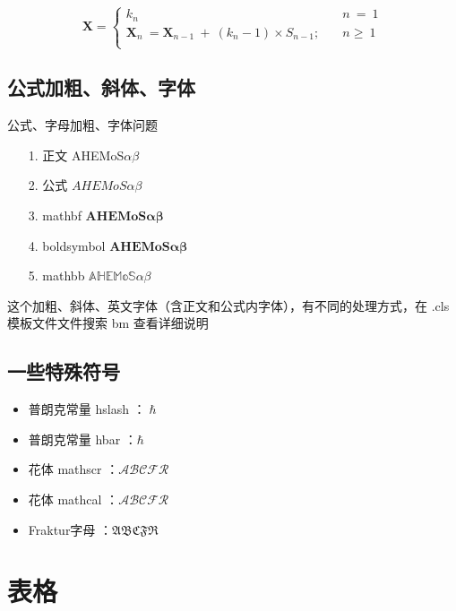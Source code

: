 \documentclass[AutoFakeBold]{LZUThesis-PgD&PhD}
\begin{document}
\begin{equation}\label{eq:multi}
  \mathbf{X}=
  \begin{cases}
    k_n \quad & n \ = \ 1  \\
    \mathbf{X}_n \ = \mathbf{X}_{n-1}\ +\ (k_n-1)\times S_{n-1};
    \quad     & n \geq \ 1 \\
  \end{cases}
\end{equation}

\subsection{公式加粗、斜体、字体}

公式、字母加粗、字体问题

\begin{itemize}
  \item[1.] 正文 \qquad \quad AHEMoS$\alpha \beta$
  \item[2.] 公式 \qquad \quad $AHEMoS \alpha \beta$
  \item[3.] mathbf \qquad $\mathbf{AHEMoS\alpha \beta}$
  \item[4.] boldsymbol $\boldsymbol{AHEMoS\alpha \beta}$
  \item[5.] mathbb \qquad $\mathbb{AHEMoS\alpha \beta}$
\end{itemize}

这个加粗、斜体、英文字体（含正文和公式内字体），有不同的处理方式，在 .cls 模板文件文件搜索 bm 查看详细说明

\subsection{一些特殊符号}

\begin{itemize}
  \item 普朗克常量 hslash ：$\hslash$
  \item 普朗克常量 hbar ：$\hbar$
  \item 花体 mathscr ：$\mathscr{ABCFR}$
  \item 花体 mathcal ：$\mathcal{ABCFR}$
  \item Fraktur字母 ：$\mathfrak{ABCFR}$
\end{itemize}


\section{表格}
\end{document}
